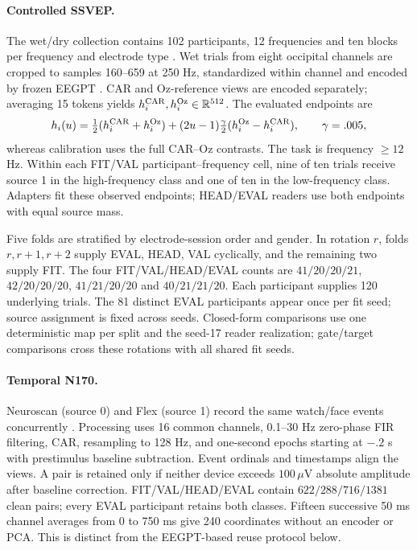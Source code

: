 \paragraph{Controlled SSVEP.}
The wet/dry collection contains 102 participants, 12 frequencies and ten
blocks per frequency and electrode type \citep{zhu2021ssvep}. Wet trials
from eight occipital channels are cropped to samples 160--659 at 250 Hz,
standardized within channel and encoded by frozen EEGPT
\citep{wang2024eegpt}. CAR and Oz-reference views are encoded separately;
averaging 15 tokens yields $h_i^{\rm CAR},h_i^{\rm Oz}\in\mathbb R^{512}$.
The evaluated endpoints are
\[
 h_i(u)=\tfrac12(h_i^{\rm CAR}+h_i^{\rm Oz})
 +(2u-1)\tfrac{\gamma}{2}(h_i^{\rm Oz}-h_i^{\rm CAR}),\qquad\gamma=.005,
\]
whereas calibration uses the full CAR--Oz contrasts. The task is frequency
$\geq12$ Hz. Within each FIT/VAL participant--frequency cell, nine of ten
trials receive source 1 in the high-frequency class and one of ten in the
low-frequency class. Adapters fit these observed endpoints; HEAD/EVAL
readers use both endpoints with equal source mass.

Five folds are stratified by electrode-session order and gender. In rotation
$r$, folds $r,r+1,r+2$ supply EVAL, HEAD, VAL cyclically, and the remaining
two supply FIT. The four FIT/VAL/HEAD/EVAL counts are $41/20/20/21$,
$42/20/20/20$, $41/21/20/20$ and $40/21/21/20$. Each participant supplies
120 underlying trials. The 81 distinct EVAL participants appear once per
fit seed; source assignment is fixed across seeds. Closed-form comparisons
use one deterministic map per split and the seed-17 reader realization;
gate/target comparisons cross these rotations with all shared fit seeds.

\paragraph{Temporal N170.}
Neuroscan (source 0) and Flex (source 1) record the same watch/face events
concurrently \citep{williams2020flex}. Processing uses 16 common channels,
0.1--30 Hz zero-phase FIR filtering, CAR, resampling to 128 Hz, and one-second
epochs starting at $-.2$ s with prestimulus baseline subtraction. Event
ordinals and timestamps align the views. A pair is retained only if neither
device exceeds $100\,\mu$V absolute amplitude after baseline correction.
FIT/VAL/HEAD/EVAL contain $622/288/716/1381$ clean pairs; every EVAL
participant retains both classes. Fifteen successive 50 ms channel averages
from 0 to 750 ms give 240 coordinates without an encoder or PCA. This is
distinct from the EEGPT-based reuse protocol below.

